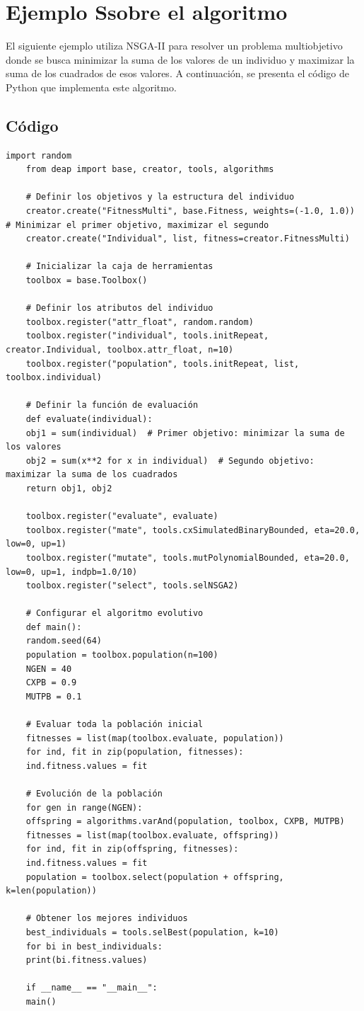 \documentclass[12pt]{article}
\begin{document}
\section*{Ejemplo Ssobre el algoritmo }
El siguiente ejemplo utiliza NSGA-II para resolver un problema multiobjetivo donde se busca minimizar la suma de los valores de un individuo y maximizar la suma de los cuadrados de esos valores. A continuación, se presenta el código de Python que implementa este algoritmo.

\subsection*{Código}
\begin{lstlisting}[style=python]
	import random
	from deap import base, creator, tools, algorithms
	
	# Definir los objetivos y la estructura del individuo
	creator.create("FitnessMulti", base.Fitness, weights=(-1.0, 1.0))  # Minimizar el primer objetivo, maximizar el segundo
	creator.create("Individual", list, fitness=creator.FitnessMulti)
	
	# Inicializar la caja de herramientas
	toolbox = base.Toolbox()
	
	# Definir los atributos del individuo
	toolbox.register("attr_float", random.random)
	toolbox.register("individual", tools.initRepeat, creator.Individual, toolbox.attr_float, n=10)
	toolbox.register("population", tools.initRepeat, list, toolbox.individual)
	
	# Definir la función de evaluación
	def evaluate(individual):
	obj1 = sum(individual)  # Primer objetivo: minimizar la suma de los valores
	obj2 = sum(x**2 for x in individual)  # Segundo objetivo: maximizar la suma de los cuadrados
	return obj1, obj2
	
	toolbox.register("evaluate", evaluate)
	toolbox.register("mate", tools.cxSimulatedBinaryBounded, eta=20.0, low=0, up=1)
	toolbox.register("mutate", tools.mutPolynomialBounded, eta=20.0, low=0, up=1, indpb=1.0/10)
	toolbox.register("select", tools.selNSGA2)
	
	# Configurar el algoritmo evolutivo
	def main():
	random.seed(64)
	population = toolbox.population(n=100)
	NGEN = 40
	CXPB = 0.9
	MUTPB = 0.1
	
	# Evaluar toda la población inicial
	fitnesses = list(map(toolbox.evaluate, population))
	for ind, fit in zip(population, fitnesses):
	ind.fitness.values = fit
	
	# Evolución de la población
	for gen in range(NGEN):
	offspring = algorithms.varAnd(population, toolbox, CXPB, MUTPB)
	fitnesses = list(map(toolbox.evaluate, offspring))
	for ind, fit in zip(offspring, fitnesses):
	ind.fitness.values = fit
	population = toolbox.select(population + offspring, k=len(population))
	
	# Obtener los mejores individuos
	best_individuals = tools.selBest(population, k=10)
	for bi in best_individuals:
	print(bi.fitness.values)
	
	if __name__ == "__main__":
	main()
\end{lstlisting}
\end{document}
